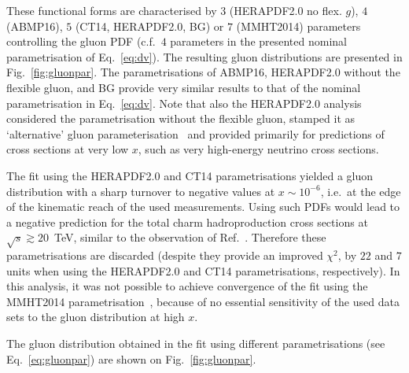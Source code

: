 \documentclass[12pt]{article}
\begin{document}
These functional forms are characterised by $3$ (HERAPDF2.0 no flex. $g$), $4$ (ABMP16), $5$ (CT14, HERAPDF2.0, BG) or $7$ (MMHT2014) parameters controlling the gluon PDF (c.f.\ $4$ parameters in the presented nominal parametrisation of Eq.~\ref{eq:dv}). 
The resulting gluon distributions are presented in Fig.~\ref{fig:gluonpar}. The parametrisations of ABMP16, HERAPDF2.0 without the flexible gluon, and BG provide very similar results to that of the nominal parametrisation in Eq.~\ref{eq:dv}. 
Note that also the HERAPDF2.0 analysis considered the parametrisation without the flexible gluon, stamped it as `alternative' gluon parameterisation~\cite{Abramowicz:2015mha} and provided primarily for predictions of cross sections at very low $x$, such as very high-energy neutrino cross sections.

The fit using the HERAPDF2.0 and CT14 parametrisations yielded a gluon distribution with a sharp turnover to negative values 
at $x \sim 10^{-6}$, i.e.\ at the edge of the kinematic reach of the used measurements. Using such PDFs would 
lead to a negative prediction for the total charm hadroproduction cross sections at $\sqrt{s} \gtrsim 20$~TeV, similar to the observation of Ref.~\cite{Accardi:2016ndt}. Therefore these parametrisations are discarded (despite they provide an improved $\chi^2$, by $22$ and $7$ units when using the HERAPDF2.0 and CT14 parametrisations, respectively). In this analysis, it was not possible to achieve convergence of the fit using the MMHT2014 parametrisation~\cite{Harland-Lang:2014zoa}, because of no essential sensitivity of the used data sets to the gluon distribution at high $x$.


The gluon distribution obtained in the fit using different parametrisations (see Eq.~\ref{eq:gluonpar}) are shown on Fig.~\ref{fig:gluonpar}.
\end{document}
